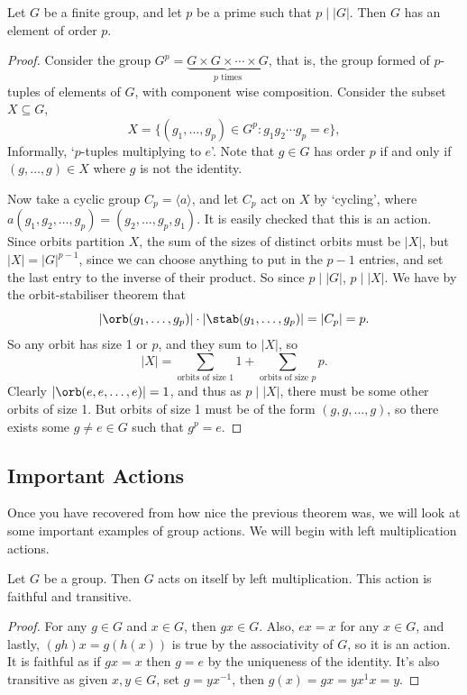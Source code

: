 \documentclass[a4paper]{scrartcl}
\newcommand{\newsection}{\subsection}
\begin{document}
\begin{theorem}
	Let $G$ be a finite group, and let $p$ be a prime such that $p \mid |G|$. Then $G$ has an element of order $p$.
\end{theorem}
\begin{proof}
	Consider the group $G^p = \underbrace{G\times G \times \cdots \times G}_{p\text{ times}}$, that is, the group formed of $p$-tuples of elements of $G$, with component wise composition. Consider the subset $X \subseteq G$,
	$$
	X = \{(g_1, \dots, g_p) \in G^p : g_1 g_2 \cdots g_p = e\},
	$$
	Informally, `$p$-tuples multiplying to $e$'. Note that $g \in G$ has order $p$ if and only if $(g, \dots, g) \in X$ where $g$ is not the identity.

	Now take a cyclic group $C_p = \langle a \rangle$, and let $C_p$ act on $X$ by `cycling', where $a(g_1, g_2, \dots, g_p) = (g_2, \dots, g_p, g_1)$. It is easily checked that this is an action.
	Since orbits partition $X$, the sum of the sizes of distinct orbits must be $|X|$, but $|X| = |G|^{p - 1}$, since we can choose anything to put in the $p - 1$ entries, and set the last entry to the inverse of their product. So since $p \mid |G|$, $p \mid |X|$. We have by the orbit-stabiliser theorem that
	$$
	|\orb(g_1, \dots, g_p)| \cdot |\stab(g_1, \dots, g_p)| = |C_p| = p.
	$$
	So any orbit has size 1 or $p$, and they sum to $|X|$, so
	$$
	|X| = \sum_{\text{orbits of size 1}} 1 + \sum_{\text{orbits of size $p$}} p.
	$$
	Clearly $|\orb(e, e, \dots, e)| = 1$, and thus as $p \mid |X|$, there must be some other orbits of size 1.
	But orbits of size 1 must be of the form $(g, g, \dots, g)$, so there exists some $g \neq e \in G$ such that $g^p = e$.
\end{proof}

\newsection{Important Actions}

Once you have recovered from how nice the previous theorem was, we will look at some important examples of group actions. We will begin with left multiplication actions.

\begin{lemma}
	Let $G$ be a group. Then $G$ acts on itself by left multiplication. This action is faithful and transitive.
\end{lemma}
\begin{proof}
	For any $g \in G$ and $x \in G$, then $gx \in G$. Also, $ex = x$ for any $x \in G$, and lastly, $(gh)x = g(h(x))$ is true by the associativity of $G$, so it is an action. It is faithful as if $gx = x$ then $g = e$ by the uniqueness of the identity. It's also transitive as given $x, y \in G$, set $g = yx^{-1}$, then $g(x) = gx = yx^{1}x = y$. 
\end{proof}
\end{document}
